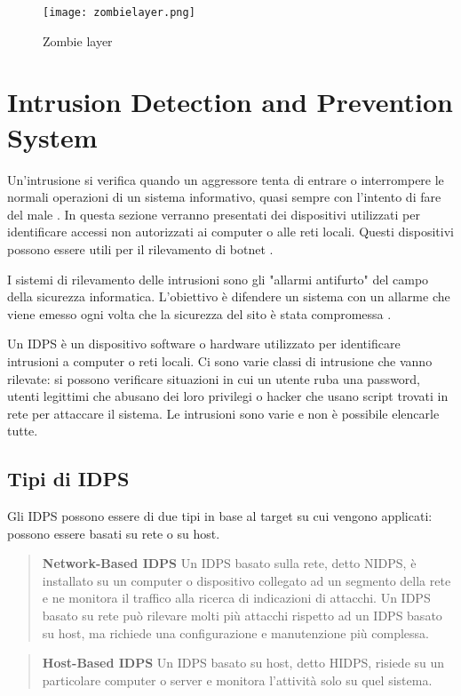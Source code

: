 \documentclass[../main.tex]{subfiles}
\begin{document}
\begin{figure}[H]
				\centering
				\texttt{[image: zombielayer.png]}
				\caption{Zombie layer}
\end{figure}

\section{Intrusion Detection and Prevention System}
Un'intrusione si verifica quando un aggressore tenta di entrare o interrompere le normali operazioni di un sistema informativo, quasi sempre con l'intento di fare del male \cite{idsbook}.
In questa sezione verranno presentati dei dispositivi utilizzati per identificare accessi non autorizzati ai computer o alle reti locali. Questi dispositivi possono essere utili per il rilevamento di botnet \cite{botnetdetection}.


I sistemi di rilevamento delle intrusioni sono gli "allarmi antifurto" del campo della sicurezza informatica. L'obiettivo è difendere un sistema con un allarme che viene emesso ogni volta che la sicurezza del sito è stata compromessa \cite{IDS}. 

Un IDPS è un dispositivo software o hardware utilizzato per identificare intrusioni a computer o reti locali.
Ci sono varie classi di intrusione che vanno rilevate: si possono verificare situazioni in cui un utente ruba una password, utenti legittimi che abusano dei loro privilegi o hacker che usano script trovati in rete per attaccare il sistema. Le intrusioni sono varie e non è possibile elencarle tutte.

\subsection{Tipi di IDPS}
Gli IDPS possono essere di due tipi in base al target su cui vengono applicati: possono essere basati su rete o su host.
\begin{verse}
				\textbf{Network-Based IDPS} Un IDPS basato sulla rete, detto NIDPS, è installato su un computer o dispositivo collegato ad un segmento della rete e ne monitora il traffico alla ricerca di indicazioni di attacchi. Un IDPS basato su rete può rilevare molti più attacchi rispetto ad un IDPS basato su host, ma richiede una configurazione e manutenzione più complessa. 
\end{verse}
\begin{verse}
				\textbf{Host-Based IDPS} Un IDPS basato su host, detto HIDPS, risiede su un particolare computer o server e monitora l'attività solo su quel sistema.
\end{verse}
\end{document}
